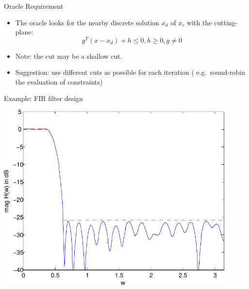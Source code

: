 \documentclass[10pt,ignorenonframetext,serif,onlymath]{beamer}
\begin{document}
\begin{frame}{Oracle Requirement}
\protect\hypertarget{sec:oracle-requirement}{}

\begin{itemize}
\item
  The oracle looks for the nearby discrete solution \(x_d\) of \(x_c\)
  with the cutting-plane:
  \[g^T (x - x_d) + h \leq 0, h \geq 0, g \neq 0\]
\item
  Note: the cut may be a shallow cut.
\item
  Suggestion: use different cuts as possible for each iteration (
  e.g.~round-robin the evaluation of constraints)
\end{itemize}

\end{frame}

\begin{frame}{Example: FIR filter design}
\protect\hypertarget{sec:example-fir-filter-design-1}{}

\includegraphics[width=0.9\textwidth,height=\textheight]{ellipsoid.files/lowpass_ripple.pdf}

\end{frame}
\end{document}
